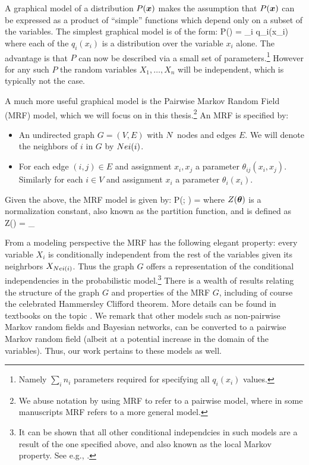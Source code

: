 A graphical model of a distribution $P(\boldsymbol{x})$ makes the assumption that $P(\boldsymbol{x})$ can be expressed as a product of ``simple'' functions which depend only on a subset of the variables. The simplest graphical model is of the form:
\be
P(\xx) = \prod_i q_i(x_i)
\label{eq:independent}
\ee
where each of the $q_i(x_i)$ is a distribution over the variable $x_i$ alone. The advantage is that $P$ can now be described via a small set of parameters.\footnote{Namely $\sum_i n_i$ parameters required for specifying all $q_i(x_i)$ values.} However for any such $P$ the random variables $X_1,\ldots,X_n$ will be independent, which is typically not the case.

A much more useful graphical model is the Pairwise Markov Random Field (MRF) model, which we will focus on in this thesis.\footnote{We abuse notation by using MRF to refer to a pairwise model, where in some manuscripts MRF refers to a more general model.} An MRF is specified by:
\begin{itemize}
\item An undirected graph $G=(V,E)$ with $N$ nodes and edges $E$. We will denote the neighbors of $i$ in $G$ by $Nei(i)$.
\item For each edge $(i,j)\in E$ and assignment $x_i,x_j$ a parameter $\theta_{ij}(x_i,x_j)$. Similarly for each $i\in V$ and assignment $x_i$ a parameter $\theta_i(x_i)$. 
\end{itemize}  

Given the above, the MRF model is given by:
\be
\label{eq:basic_model}
P(\xx; \thetav) =  
\ee
where $Z(\boldsymbol{\theta})$ is a normalization constant, also known as the partition function, and is defined as 
\be
\label{eq:partition_function}
Z(\thetav) = \sum_{\xx \in\cX}
\ee

From a modeling perspective the MRF has the following elegant property: every variable $X_i$ is conditionally independent from the rest of the variables given its neighrbors $X_{Nei(i)}$. Thus the graph $G$ offers a representation of the conditional independencies in the probabilistic model.\footnote{It can be shown that all other conditional independcies in such models are a result of the one specified above, and also known as the local Markov property. See e.g., \cite{koller2009probabilistic}.} There is a wealth of results relating the structure of the graph $G$ and properties of the MRF $G$, including of course the celebrated Hammersley Clifford theorem. More details can be found in textbooks on the topic \cite{koller2009probabilistic}. We remark that other models such as non-pairwise Markov random fields and Bayesian networks, can be converted to a pairwise Markov random field (albeit at a potential increase in the domain of the variables). Thus, our work pertains to these models as well.

